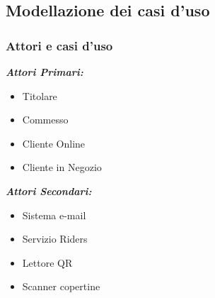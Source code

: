 \documentclass[12pt, a4paper]{article}
\begin{document}
\newpage
\subsection{Modellazione dei casi d’uso}
\subsubsection{Attori e casi d’uso}
\textbf{\textit{Attori Primari:}}
\begin{multicols}{2}
  \begin{itemize}
    \item Titolare
    \item Commesso
    \item Cliente Online
    \item Cliente in Negozio
  \end{itemize}
\end{multicols}
\textbf{\textit{Attori Secondari:}}
\begin{multicols}{2}
  \begin{itemize}
    \item Sistema e-mail
    \item Servizio Riders
    \item Lettore QR
    \item Scanner copertine
  \end{itemize}
\end{multicols}
\end{document}
